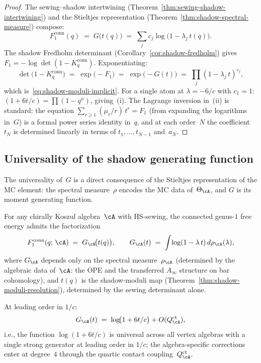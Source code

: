 \begin{proof}
The sewing--shadow intertwining
(Theorem~\ref{thm:sewing-shadow-intertwining})
and the Stieltjes representation
(Theorem~\ref{thm:shadow-spectral-measure}) compose:
\[
 F_1^{\mathrm{conn}}(q)
 \;=\;
 G\!\bigl(t(q)\bigr)
 \;=\;
 \sum_j c_j\log\!\bigl(1 - \lambda_j\,t(q)\bigr).
\]
The shadow Fredholm determinant
(Corollary~\ref{cor:shadow-fredholm}) gives
$F_1 = -\log\det(1 - K_q^{\mathrm{conn}})$.
Exponentiating:
\[
 \det\!\bigl(1 - K_q^{\mathrm{conn}}\bigr)
 \;=\;
 \exp\!\bigl(-F_1\bigr)
 \;=\;
 \exp\!\bigl(-G(t)\bigr)
 \;=\;
 \prod_j (1 - \lambda_j\,t)^{c_j},
\]
which is~\eqref{eq:shadow-moduli-implicit}. For a single atom
at $\lambda = -6/c$ with $c_1 = 1$:
$(1 + 6t/c) = \prod(1-q^n)$, giving~(i).
The Lagrange inversion in~(ii) is standard:
the equation
$\sum_{r\ge1}(\mu_r/r)\,t^r = F_1$
(from expanding the logarithms in~$G$) is a formal
power series identity in~$q$, and at each order~$N$
the coefficient~$t_N$ is determined linearly in terms of
$t_1, \dotsc, t_{N-1}$ and~$a_N$.
\end{proof}

\subsection{Universality of the shadow generating function}%
\label{sec:universality-G}

The universality of~$G$ is a direct consequence of the
Stieltjes representation of the MC element: the spectral
measure~$\rho$ encodes the MC data of~$\Theta_\cA$, and $G$
is its moment generating function.

\begin{theorem}[Universality of $G$]%
\label{thm:universality-of-G}%
\ClaimStatusConditional%
For any chirally Koszul algebra~$\cA$ with HS-sewing, the
connected genus-$1$ free energy admits the factorization
\begin{equation}\label{eq:universality-factorization}
 F_1^{\mathrm{conn}}(q;\,\cA)
 \;=\;
 G_\cA\!\bigl(t(q)\bigr),
 \qquad
 G_\cA(t)
 \;=\;
 \int\!\log(1 - \lambda\,t)\,d\rho_\cA(\lambda),
\end{equation}
where $G_\cA$ depends only on the spectral measure~$\rho_\cA$
\textup{(}determined by the algebraic data of~$\cA$: the OPE and
the transferred $A_\infty$ structure on bar
cohomology\textup{)}, and $t(q)$ is the shadow-moduli map
\textup{(}Theorem~\textup{\ref{thm:shadow-moduli-resolution}}\textup{)},
determined by the sewing determinant alone.

At leading order in $1/c$:
\begin{equation}\label{eq:G-leading-order}
 G_\cA(t)
 \;=\;
 \log\!\bigl(1 + 6t/c\bigr)
 + O(Q^{\mathrm{ct}}_\cA),
\end{equation}
i.e., the function $\log(1+6t/c)$ is universal
across all vertex algebras with a single strong generator
at leading order in $1/c$; the
algebra-specific corrections enter at degree~$4$ through
the quartic contact coupling~$Q^{\mathrm{ct}}_\cA$.
\end{theorem}

